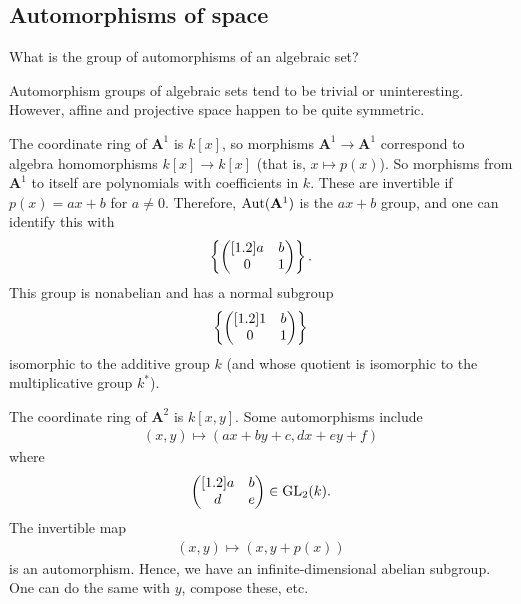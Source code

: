 \documentclass [11 pt, oneside, margin = 1 in] {article}
\begin{document}
\subsection{Automorphisms of space}
\begin{problem}
	What is the group of automorphisms of an algebraic set?
\end{problem}

Automorphism groups of algebraic sets tend to be trivial or uninteresting. However, affine and projective space happen to be quite symmetric.

\begin{example}\label{}\text{}
The coordinate ring of $\mathbf{A}^1$ is $k[x]$, so morphisms $\mathbf{A}^1\longrightarrow \mathbf{A}^1$ correspond to algebra homomorphisms $k[x]\longrightarrow k[x]$ (that is, $x\longmapsto p(x)$). So morphisms from $\mathbf{A}^1$ to itself are polynomials with coefficients in $k$. These are invertible if $p(x) = ax+b$ for $a\ne 0$. Therefore, $\operatorname{Aut}(\mathbf{A}^1)$ is the $ax+b$ group, and one can identify this with
\begin{align*}
	\left\{ \begin{pmatrix} [ 1.2 ] a&b\\0&1\end{pmatrix} \right\}. 
\end{align*}
This group is nonabelian and has a normal subgroup 
\begin{align*}
	\left\{\begin{pmatrix} [ 1.2 ]  1&b\\0&1\end{pmatrix} \right\} 
\end{align*}
isomorphic to the additive group $k$ (and whose quotient is isomorphic to the multiplicative group $k^*$).
\end{example}

\begin{example}\label{}\text{}
The coordinate ring of $\mathbf{A}^2$ is $k[x,y]$. Some automorphisms include 
\begin{align*}
	(x,y)\longmapsto (ax+by+c, dx+ey+f) 
\end{align*}
where
\begin{align*}
	\begin{pmatrix} [ 1.2 ] a&b\\d&e\end{pmatrix} \in \operatorname{GL}_{2}(k).
\end{align*}
The invertible map
\begin{align*}
	(x,y)\longmapsto  (x,y+p(x))
\end{align*}
is an automorphism. Hence, we have an infinite-dimensional abelian subgroup. One can do the same with $y$, compose these, etc. 
\end{example}
\end{document}
